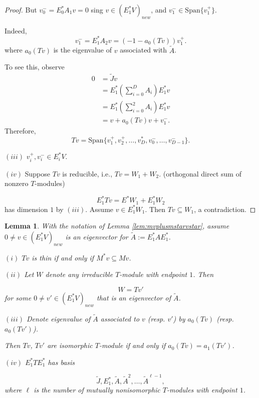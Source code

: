 \documentclass[
]{book}
\newtheorem{lemma}{Lemma}[chapter]
\theoremstyle{definition}
\theoremstyle{definition}
\theoremstyle{definition}
\theoremstyle{definition}
\theoremstyle{remark}
\begin{document}
\begin{proof}
But \(v^-_0 = E^*_0A_1v = 0\) sing \(v\in (E^*_1V)_{new}\), and \(v^-_1\in \mathrm{Span}\{v^+_1\}\).

Indeed,
\[v^-_1 = E^*_1A_2v = (-1-a_0(Tv))v^+_1.\]
where \(a_0(Tv)\) is the eigenvalue of \(v\) associated with \(\tilde{A}\).

To see this, observe
\begin{align}
0 & = \tilde{J}v\\
& = E^*_1\left(\sum_{i=0}^DA_i\right)E^*_1v\\
& = E^*_1\left(\sum_{i=0}^2A_i\right)E^*_1v\\
& = v + a_0(Tv)v + v^-_1.
\end{align}
Therefore,
\[Tv = \mathrm{Span}\{v^+_1, v^+_2, \ldots, v^*_D, v_0^-, \ldots, v^-_{D-1}\}.\]

\((iii)\) \(v^+_i, v^-_i\in E^*_iV\).

\((iv)\) Suppose \(Tv\) is reducible, i.e., \(Tv = W_1 + W_2\). (orthogonal direct sum of nonzero \(T\)-modules)

\[E^*_1Tv = E^*W_1 + E^*_1W_2\]
has dimension \(1\) by \((iii)\). Assume \(v\in E^*_1W_1\). Then \(Tv \subseteq W_1\), a contradiction.

\end{proof}

\begin{lemma}
\protect\hypertarget{lem:tv-thin}{}\label{lem:tv-thin}With the notation of Lemma \ref{lem:mvplusmstarvstar}, assume \(0\neq v\in (E^*_1V)_{new}\) is an eigenvector for \(\tilde{A}:=E^*_1AE^*_1\).

\((i)\) \(Tv\) is thin if and only if \(M^*v \subseteq Mv\).

\((ii)\) Let \(W\) denote any irreducible \(T\)-module with endpoint \(1\). Then

\[W = Tv'\]
for some \(0\neq v'\in (E^*_1V)_{new}\) that is an eigenvector of \(\tilde{A}\).

\((iii)\) Denote eigenvalue of \(\tilde{A}\) associated to \(v\) (resp. \(v'\)) by \(a_0(Tv)\) (resp. \(a_0(Tv')\)).

Then \(Tv\), \(Tv'\) are isomorphic \(T\)-module if and only if \(a_0(Tv) = a_1(Tv')\).

\((iv)\) \(E^*_1TE^*_1\) has basis

\[\tilde{J}, E^*_1, \tilde{A}, \tilde{A}^2, \ldots, \tilde{A}^{\ell-1},\]
where \(\ell\) is the number of mutually nonisomorphic \(T\)-modules with endpoint \(1\).
\end{lemma}
\end{document}
